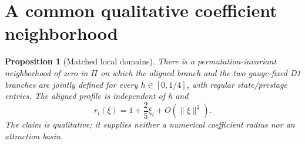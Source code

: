 \documentclass[11pt,a4paper]{article}
\numberwithin{equation}{section}
\newtheorem{proposition}[theorem]{Proposition}
\theoremstyle{remark}\newtheorem{remark}[theorem]{Remark}
\begin{document}
\section{A common qualitative coefficient neighborhood}\label{sec:domain}
\begin{proposition}[Matched local domains]\label{prop:domain}
There is a permutation-invariant neighborhood of zero in $\Pi$ on which the aligned branch and the two gauge-fixed D1 branches are jointly defined for every $h\in[0,1/4]$, with regular state/prestage entries. The aligned profile is independent of h and
\begin{equation}
r_i(\xi)=1+\frac25\xi_i+O(\|\xi\|^2).
\label{eq:tangent}
\end{equation}
The claim is qualitative; it supplies neither a numerical coefficient radius nor an attraction basin.
\end{proposition}
\end{document}
